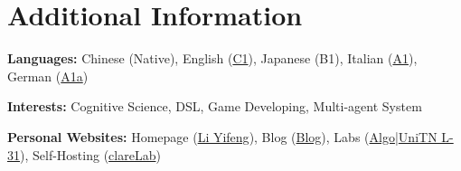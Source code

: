 \documentclass[a4paper,11pt]{article}
\begin{document}
	\section{\textbf{Additional Information}}
	\vspace{-0.4mm}
	\small{
		\textbf{Languages:}
			Chinese
				(Native),
			English
				({\href{https://yifen9.li/lang/en_ielts.pdf}{C1}}),
			Japanese
				(B1),
			Italian
				({\href{https://yifen9.li/lang/it_unitn.png}{A1}}),
			German
				({\href{https://yifen9.li/lang/de_unitn.png}{A1a}})
		
		\textbf{Interests:}
			Cognitive Science,
			DSL,
			Game Developing,
			Multi-agent System
		
		\textbf{Personal Websites:}
			Homepage
				({\href{https://yifen9.li}{Li Yifeng}}),
			Blog
				({\href{https://blog.yifen9.li}{Blog}}),
			Labs
				({\href{https://algo.yifen9.li}{Algo}}|{\href{https://unitn.yifen9.li}{UniTN L-31}}),
			Self-Hosting
				({\href{https://clarelab.moe}{clareLab}})
	}
	\vspace{-4mm}
	
\end{document}
